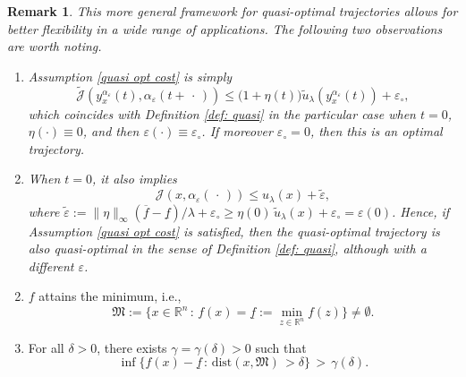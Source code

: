 \documentclass[10pt,a4paper]{amsart}
\newtheorem{remark}{Remark}
\begin{document}
\begin{remark} \label{rem: (C)}
This more general framework for quasi-optimal trajectories allows for better flexibility in a wide range of applications. The following two observations are worth noting.
\begin{enumerate}
    \item Assumption \ref{quasi opt cost} is simply
    \begin{equation*}
       \widetilde{\mathscr{J}}(y_{x}^{\alpha_{\varepsilon}}(t),\alpha_{\varepsilon}(t+\,\cdot\,)) \leq \big(1+\eta(t)\big)\tilde{u}_{\lambda}(y_{x}^{\alpha_{\varepsilon}}(t)) + \varepsilon_{\circ},
    \end{equation*}
    which coincides with Definition \ref{def: quasi} in the particular case when $t=0$, $\eta(\cdot)\equiv 0$, and then $\varepsilon(\cdot)\equiv \varepsilon_{\circ}$. If moreover $\varepsilon_{\circ}=0$, then this is an optimal trajectory. 
    \item When $t=0$, it also implies 
    \begin{equation*}
       {\mathscr{J}}(x,\alpha_{\varepsilon}(\,\cdot\,)) \leq {u}_{\lambda}(x) + \tilde{\varepsilon} ,
    \end{equation*} 
    where $\tilde{\varepsilon} := \|\eta\|_{\infty}(\overline{f}-\underline{f})/\lambda + \varepsilon_{\circ} \geq \eta(0)\,\tilde{u}_{\lambda}(x) + \varepsilon_{\circ} = \varepsilon(0)$. Hence, if Assumption \ref{quasi opt cost} is satisfied, then the quasi-optimal trajectory is also quasi-optimal in the sense of Definition \ref{def: quasi}, although with a different $\varepsilon$.
\end{enumerate}

\end{remark}

\begin{enumerate}[label=\textbf{(A\arabic*)}]
\setcounter{enumi}{1}
\item\label{f: has min} $f$ attains the minimum, i.e.,  
  \begin{equation*}
    \mathfrak{M}:=\{x\in\mathbb{R}^{n}\,:\, f(x) = \underline{f}:= \min\limits_{z\in\mathbb{R}^{n}}f(z)\} \ne \emptyset .
\end{equation*}
\item\label{f: stab} For all $\delta>0$, there exists  $\gamma=\gamma(\delta)>0$ such that
    \begin{equation*}
         \inf\{f(x) - \underline{f}\,:\,\text{dist}(x,\mathfrak{M})\,> \delta\} \,>\, \gamma(\delta).
    \end{equation*}
\end{enumerate}
\end{document}
